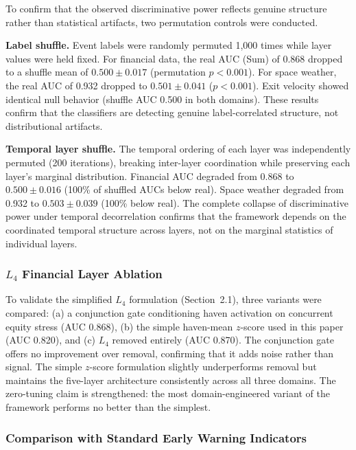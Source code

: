 \documentclass[aip,cha,reprint,amsmath,amssymb]{revtex4-2}
\begin{document}
To confirm that the observed discriminative power reflects genuine structure rather than statistical artifacts, two permutation controls were conducted.

\textbf{Label shuffle.} Event labels were randomly permuted 1,000 times while layer values were held fixed. For financial data, the real AUC (Sum) of 0.868 dropped to a shuffle mean of $0.500 \pm 0.017$ (permutation $p < 0.001$). For space weather, the real AUC of 0.932 dropped to $0.501 \pm 0.041$ ($p < 0.001$). Exit velocity showed identical null behavior (shuffle AUC 0.500 in both domains). These results confirm that the classifiers are detecting genuine label-correlated structure, not distributional artifacts.

\textbf{Temporal layer shuffle.} The temporal ordering of each layer was independently permuted (200 iterations), breaking inter-layer coordination while preserving each layer's marginal distribution. Financial AUC degraded from 0.868 to $0.500 \pm 0.016$ (100\% of shuffled AUCs below real). Space weather degraded from 0.932 to $0.503 \pm 0.039$ (100\% below real). The complete collapse of discriminative power under temporal decorrelation confirms that the framework depends on the coordinated temporal structure across layers, not on the marginal statistics of individual layers.

\subsubsection{\label{sec:l4ablation}$L_4$ Financial Layer Ablation}

To validate the simplified $L_4$ formulation (Section~2.1), three variants were compared: (a) a conjunction gate conditioning haven activation on concurrent equity stress (AUC 0.868), (b) the simple haven-mean $z$-score used in this paper (AUC 0.820), and (c) $L_4$ removed entirely (AUC 0.870). The conjunction gate offers no improvement over removal, confirming that it adds noise rather than signal. The simple $z$-score formulation slightly underperforms removal but maintains the five-layer architecture consistently across all three domains. The zero-tuning claim is strengthened: the most domain-engineered variant of the framework performs no better than the simplest.

\subsubsection{Comparison with Standard Early Warning Indicators}
\end{document}
